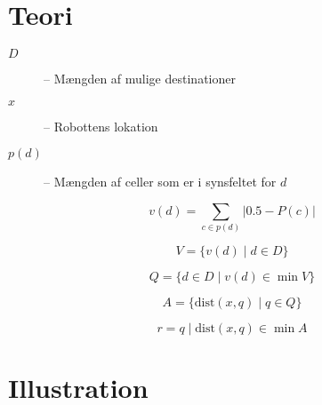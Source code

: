 
\section{Teori}
\begin{description}
\item[$D$]{-- Mængden af mulige destinationer}
\item[$x$]{-- Robottens lokation}
\item[$p(d)$]{-- Mængden af celler som er i synsfeltet for $d$}
\end{description}

\begin{equation}
v(d) = \sum_{c \in p(d)} |0.5 - P(c)|
\end{equation}

\begin{equation}
V = \{ v(d) \mid d \in D \}
\end{equation}

\begin{equation}
Q = \{ d \in D \mid v(d) \in \min V \}
\end{equation}

\begin{equation}
A = \{ \text{dist}(x,q) \mid q \in Q \}
\end{equation}

\begin{equation}
r =  q \mid \text{dist}(x,q) \in \min A
\end{equation}

\section{Illustration}

\newcommand{\dbox}[3][]{\node (robot) [block] at ($(#2*\cellsize,#3*\cellsize) + (\cellsize/2,\cellsize/2)$) {$\scriptstyle #1$};}

\begin{figure}
\centering
{}
\end{figure}
